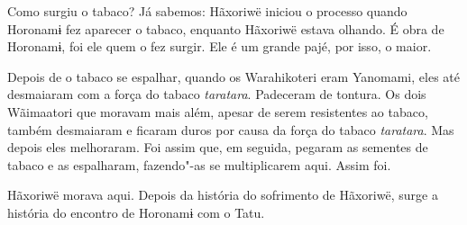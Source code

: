 Como surgiu o tabaco? Já sabemos: Hãxoriwë iniciou o processo quando
Horonamɨ fez aparecer o tabaco, enquanto Hãxoriwë estava olhando. É obra
de Horonamɨ, foi ele quem o fez surgir. Ele é um grande pajé, por isso,
o maior. 

Depois de o tabaco se espalhar, quando os Warahikoteri eram Yanomami,
eles até desmaiaram com a força do tabaco \emph{taratara}. Padeceram de
tontura. Os dois Wãimaatori que moravam mais além, apesar de serem
resistentes ao tabaco, também desmaiaram e ficaram duros por causa da
força do tabaco \emph{taratara}. Mas depois eles melhoraram. Foi assim
que, em seguida, pegaram as sementes de tabaco e as espalharam,
fazendo"-as se multiplicarem aqui. Assim foi.

Hãxoriwë morava aqui. Depois da história do sofrimento de Hãxoriwë,
surge a história do encontro de Horonamɨ com o Tatu.
